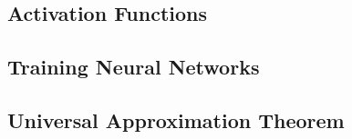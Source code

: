 \subsection{Activation Functions}


\subsection{Training Neural Networks}



\subsection{Universal Approximation Theorem}

